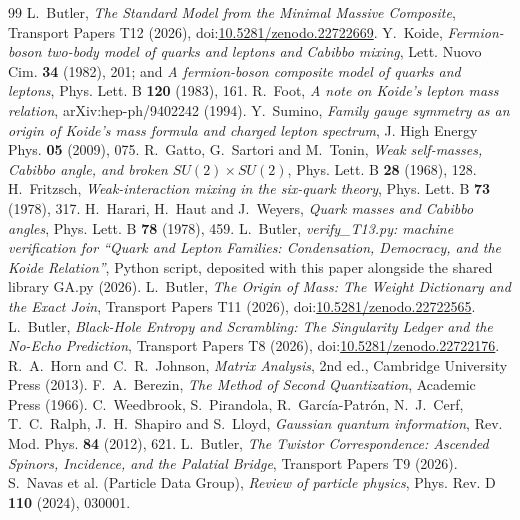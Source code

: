 \documentclass[11pt]{article}
\theoremstyle{definition}
\theoremstyle{plain}
\begin{document}
\begin{thebibliography}{99}
 L.~Butler,
\emph{The Standard Model from the Minimal Massive Composite},
Transport Papers T12 (2026), doi:\href{https://doi.org/10.5281/zenodo.22722669}{10.5281/zenodo.22722669}.
 Y.~Koide,
\emph{Fermion-boson two-body model of quarks and leptons and Cabibbo mixing},
Lett. Nuovo Cim. \textbf{34} (1982), 201; and \emph{A fermion-boson composite model of quarks and leptons}, Phys. Lett. B \textbf{120} (1983), 161.
 R.~Foot,
\emph{A note on Koide's lepton mass relation},
arXiv:hep-ph/9402242 (1994).
 Y.~Sumino,
\emph{Family gauge symmetry as an origin of Koide's mass formula and charged lepton spectrum},
J. High Energy Phys. \textbf{05} (2009), 075.
 R.~Gatto, G.~Sartori and M.~Tonin,
\emph{Weak self-masses, Cabibbo angle, and broken $SU(2) \times SU(2)$},
Phys. Lett. B \textbf{28} (1968), 128.
 H.~Fritzsch,
\emph{Weak-interaction mixing in the six-quark theory},
Phys. Lett. B \textbf{73} (1978), 317.
 H.~Harari, H.~Haut and J.~Weyers,
\emph{Quark masses and Cabibbo angles},
Phys. Lett. B \textbf{78} (1978), 459.
 L.~Butler,
\emph{verify\_T13.py: machine verification for ``Quark and Lepton Families: Condensation, Democracy, and the Koide Relation''},
Python script, deposited with this paper alongside the shared library GA.py (2026).
 L.~Butler,
\emph{The Origin of Mass: The Weight Dictionary and the Exact Join},
Transport Papers T11 (2026), doi:\href{https://doi.org/10.5281/zenodo.22722565}{10.5281/zenodo.22722565}.
 L.~Butler,
\emph{Black-Hole Entropy and Scrambling: The Singularity Ledger and the No-Echo Prediction},
Transport Papers T8 (2026), doi:\href{https://doi.org/10.5281/zenodo.22722176}{10.5281/zenodo.22722176}.
 R.~A.~Horn and C.~R.~Johnson,
\emph{Matrix Analysis}, 2nd ed.,
Cambridge University Press (2013).
 F.~A.~Berezin,
\emph{The Method of Second Quantization},
Academic Press (1966).
 C.~Weedbrook, S.~Pirandola, R.~Garc\'ia-Patr\'on, N.~J.~Cerf, T.~C.~Ralph, J.~H.~Shapiro and S.~Lloyd,
\emph{Gaussian quantum information},
Rev. Mod. Phys. \textbf{84} (2012), 621.
 L.~Butler,
\emph{The Twistor Correspondence: Ascended Spinors, Incidence, and the Palatial Bridge},
Transport Papers T9 (2026).
 S.~Navas et al. (Particle Data Group),
\emph{Review of particle physics},
Phys. Rev. D \textbf{110} (2024), 030001.

\end{thebibliography}
\end{document}
